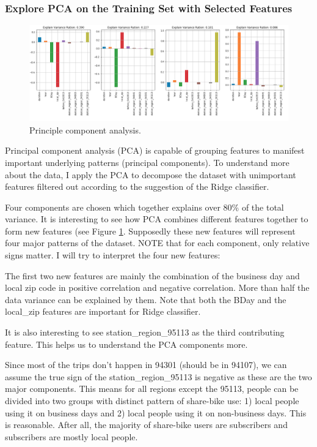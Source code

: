 \documentclass[a4paper]{article}
\begin{document}
			\subsubsection{Explore PCA on the Training Set with Selected Features}
			
			\begin{figure}
				\centering
				\includegraphics[width=1\textwidth]{PCA.png}
				\caption{\label{fig:pca}Principle component analysis.}	
			\end{figure}
			
			Principal component analysis (PCA) is capable of grouping features to manifest important underlying patterns (principal components). To understand more about the data, I apply the PCA to decompose the dataset with unimportant features filtered out according to the suggestion of the Ridge classifier. 
			
			Four components are chosen which together explains over 80\% of the total variance. It is interesting to see how PCA combines different features together to form new features (see Figure \ref{fig:pca}. Supposedly these new features will represent four major patterns of the dataset. NOTE that for each component, only relative signs matter. I will try to interpret the four new features:
			
			The first two new features are mainly the combination of the business day and local zip code in positive correlation and negative correlation. More than half the data variance can be explained by them. Note that both the BDay and the local\_zip features are important for Ridge classifier. 
			
			It is also interesting to see station\_region\_95113 as the third contributing feature. This helps us to understand the PCA components more. 
			
			Since most of the trips don't happen in 94301 (should be in 94107), we can assume the true sign of the station\_region\_95113 is negative as these are the two major components. This means for all regions except the 95113, people can be divided into two groups with distinct pattern of share-bike use: 1) local people using it on business days and 2) local people using it on non-business days. This is reasonable. After all, the majority of share-bike users are subscribers and subscribers are mostly local people.
			
\end{document}
